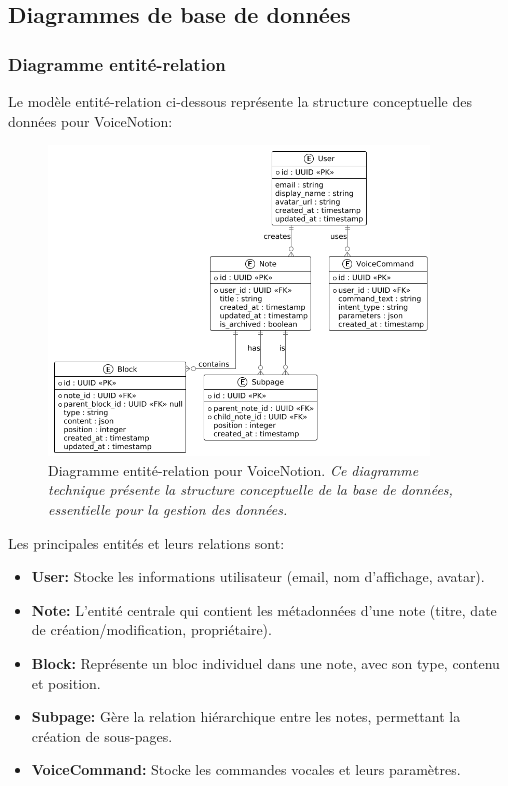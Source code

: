     \subsection{Diagrammes de base de données}
    
    \subsubsection{Diagramme entité-relation}
    
    Le modèle entité-relation ci-dessous représente la structure conceptuelle des données pour VoiceNotion:
    
        \begin{figure}[htbp]
        \centering
        \includegraphics[width=0.9\textwidth]{assets/docs/voicenotion_er_diagram.png}
        \caption{Diagramme entité-relation pour VoiceNotion. \newline\textit{Ce diagramme technique présente la structure conceptuelle de la base de données, essentielle pour la gestion des données.}}
        \label{fig:er_diagram}
    \end{figure}
    
    Les principales entités et leurs relations sont:
    
    \begin{itemize}
        \item \textbf{User:} Stocke les informations utilisateur (email, nom d'affichage, avatar).
        
        \item \textbf{Note:} L'entité centrale qui contient les métadonnées d'une note (titre, date de création/modification, propriétaire).
        
        \item \textbf{Block:} Représente un bloc individuel dans une note, avec son type, contenu et position.
        
        \item \textbf{Subpage:} Gère la relation hiérarchique entre les notes, permettant la création de sous-pages.
        
        \item \textbf{VoiceCommand:} Stocke les commandes vocales et leurs paramètres.
    \end{itemize}
    
